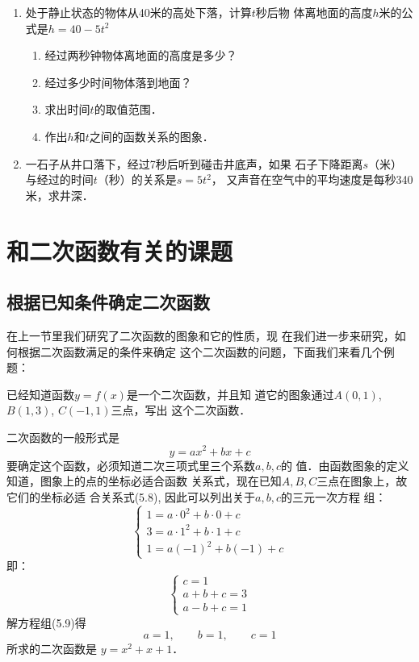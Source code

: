 \begin{enumerate}
\item 处于静止状态的物体从40米的高处下落，计算$t$秒后物
体离地面的高度$h$米的公式是$h=40-5t^2$
\begin{enumerate}
    \item 经过两秒钟物体离地面的高度是多少？
    \item 经过多少时间物体落到地面？
    \item 求出时间$t$的取值范围．
    \item 作出$h$和$t$之间的函数关系的图象．
\end{enumerate}

\item 一石子从井口落下，经过7秒后听到碰击井底声，如果
石子下降距离$s$（米）与经过的时间$t$（秒）的关系是$s=5t^2$，
又声音在空气中的平均速度是每秒340米，求井深．
\end{enumerate}

\section{和二次函数有关的课题}
\subsection{根据已知条件确定二次函数}
在上一节里我们研究了二次函数的图象和它的性质，现
在我们进一步来研究，如何根据二次函数满足的条件来确定
这个二次函数的问题，下面我们来看几个例题：


\begin{example}
    已经知道函数$y=f(x)$是一个二次函数，并且知
道它的图象通过$A(0,1)$, $B(1,3)$, $C(-1,1)$三点，写出
这个二次函数．
\end{example}

\begin{solution}
二次函数的一般形式是
\begin{equation}
    y=ax^2+bx+c
\end{equation}
要确定这个函数，必须知道二次三项式里三个系数$a,b,c$的
值．由函数图象的定义知道，图象上的点的坐标必适合函数
关系式，现在已知$A,B,C$三点在图象上，故它们的坐标必适
合关系式(5.8), 因此可以列出关于$a,b,c$的三元一次方程
组：
\[\begin{cases}
    1=a\cdot 0^2+b\cdot 0+c\\
3=a\cdot 1^2+b\cdot 1+c\\
1=a(-1)^2+b(-1)+c
\end{cases}\]
即：
\begin{equation}
    \begin{cases}
        c=1\\
a+b+c=3\\
a-b+c=1
    \end{cases}
\end{equation}
解方程组(5.9)得
\[a=1,\qquad b=1,\qquad c=1\]
所求的二次函数是
$y=x^2+x+1$．
\end{solution}
    

